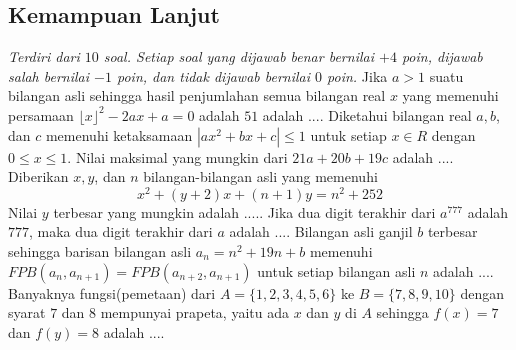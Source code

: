 \begin{questions}
\section*{Kemampuan Lanjut} 
\emph{Terdiri dari $10$ soal. Setiap soal yang dijawab benar bernilai $+4$ poin, dijawab salah bernilai $-1$ poin, dan tidak dijawab bernilai $0$ poin.}
\question Jika $a>1$ suatu bilangan asli sehingga hasil penjumlahan semua bilangan real $x$ yang memenuhi persamaan $\lfloor x\rfloor^2-2ax+a=0$ adalah $51$ adalah .... 
\question Diketahui bilangan real $a,b$, dan $c$ memenuhi ketaksamaan $|ax^2+bx+c|\leq 1$ untuk setiap $x\in R$ dengan $0\leq x\leq 1$. Nilai maksimal yang mungkin dari $21a+20b+19c$ adalah ....
\question Diberikan $x,y$, dan $n$ bilangan-bilangan asli yang memenuhi 
\[x^2+(y+2)x+(n+1)y=n^2+252\]
Nilai $y$ terbesar yang mungkin adalah .....
\question Jika dua digit terakhir dari $a^{777}$ adalah $777$, maka dua digit terakhir dari $a$ adalah ....
\question Bilangan asli ganjil $b$ terbesar sehingga barisan bilangan asli $a_n=n^2+19n+b$ memenuhi $FPB(a_n,a_{n+1})=FPB(a_{n+2},a_{n+1})$ untuk setiap bilangan asli $n$ adalah ....
\question Banyaknya fungsi(pemetaan) dari $A=\{1,2,3,4,5,6\}$ ke $B=\{7,8,9,10\}$ dengan syarat $7$ dan $8$ mempunyai prapeta, yaitu ada $x$ dan $y$ di $A$ sehingga $f(x)=7$ dan $f(y)=8$ adalah ....
\end{questions} 